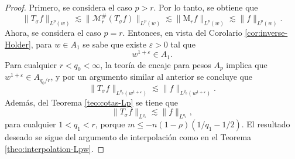 \begin{proof}
Primero, se considera el caso $p>r$. Por lo tanto, se obtiene que
\begin{equation*}
	\|T_\sigma f\|_{L^p(w)} \lesssim\| \mathcal{M}^\#_r(T_\sigma f)\|_{L^p(w)} \lesssim\|\mathrm{M}_rf\|_{L^p(w)} \lesssim\|f\|_{L^p(w)}.
\end{equation*}
Ahora, se considera el caso $p=r$. Entonces, en vista del Corolario \ref{cor:inverse-Holder}, para $w\in A_1$ se sabe que existe $\varepsilon>0$ tal que 
\begin{equation*}
	w^{1+\varepsilon} \in A_1.
\end{equation*}
Para cualquier $r<q_0<\infty$, la teoría de encaje para pesos $A_p$ implica que $w^{1+\varepsilon}\in A_{q_0/r}$, y por un argumento similar al anterior se concluye que 
\begin{equation*}
	\|T_\sigma f\|_{L^{q_0}(w^{1+\varepsilon})} \lesssim\|f\|_{L^{q_0}(w^{1+\varepsilon})}.
\end{equation*}
Además, del Teorema \ref{teo:cotas-Lp} se tiene que 
\begin{equation*}
	\|T_\sigma f\|_{L^{q_1}} \lesssim\|f\|_{L^{q_1}},
\end{equation*}
para cualquier $1<q_1<r$, porque $m \leq -n(1-\rho)(1/q_1 - 1/2)$. El resultado deseado se sigue del argumento de interpolación como en el Teorema \ref{theo:interpolation-Lpw}.
\end{proof}

